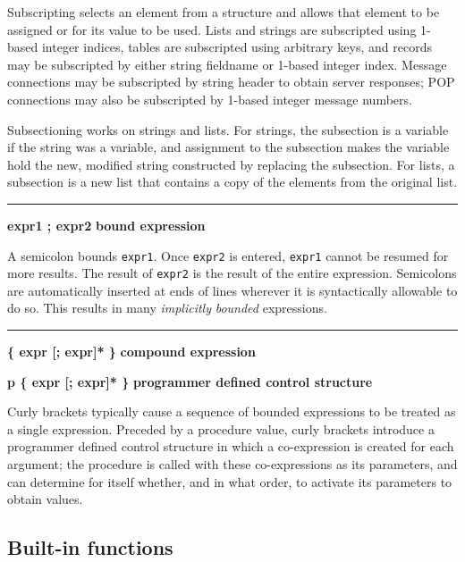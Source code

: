 Subscripting selects an element from a structure and allows that element
to be assigned or for its value to be used. Lists and strings are
subscripted using 1-based integer indices, tables are subscripted using
arbitrary keys, and records may be subscripted by either string
fieldname or 1-based integer index. Message connections may be
subscripted by string header to obtain server responses; POP
connections may also be subscripted by 1-based integer message numbers.

Subsectioning works on strings and lists. For strings, the subsection is
a variable if the string was a variable, and
assignment to the subsection makes the
variable hold the new, modified string constructed by replacing the subsection.
For lists, a subsection is a new
list that contains a copy of the elements from the original list.

\bigskip\hrule\vspace{0.1cm}
\noindent
{\bf expr1 ; expr2 } \hfill {\bf bound expression}

\noindent
A semicolon bounds \texttt{expr1}. Once \texttt{expr2} is entered,
\texttt{expr1} cannot be resumed for more results. The result of
\texttt{expr2} is the result of the entire expression.
Semicolons are automatically
inserted at ends of lines wherever it is syntactically
allowable to do so. This results in many \textit{implicitly} 
\textit{bounded} expressions.

\bigskip\hrule\vspace{0.1cm}
\noindent
{\bf \{ expr [; expr]* \} } \hfill {\bf compound expression}

\noindent
{\bf p \{ expr [; expr]* \} } \hfill {\bf programmer defined control structure}

\noindent
Curly brackets typically cause a sequence
of bounded expressions to be treated as a single expression. Preceded
by a procedure value, curly brackets introduce a programmer defined
control structure in which a co-expression is created for each
argument; the procedure is called with these co-expressions as its
parameters, and can determine for itself whether, and in what order, to
activate its parameters to obtain values.

\subsection*{Built-in functions}


